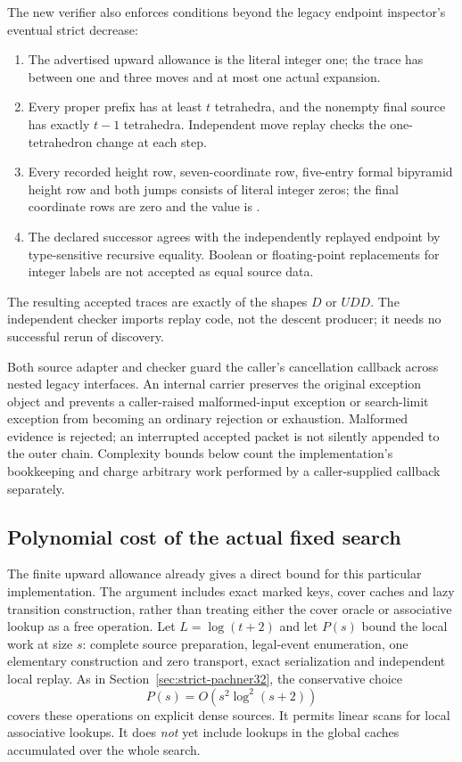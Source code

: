 The new verifier also enforces conditions beyond the legacy endpoint
inspector's eventual strict decrease:
\begin{enumerate}
\item The advertised upward allowance is the literal integer one; the
      trace has between one and three moves and at most one actual
      expansion.
\item Every proper prefix has at least $t$ tetrahedra, and the nonempty
      final source has exactly $t-1$ tetrahedra.  Independent move replay
      checks the one-tetrahedron change at each step.
\item Every recorded height row, seven-coordinate row, five-entry
      formal bipyramid height row and both jumps consists of literal
      integer zeros; the final coordinate rows are zero and the
       value is .
\item The declared successor agrees with the independently replayed
      endpoint by type-sensitive recursive equality.  Boolean or
      floating-point replacements for integer labels are not accepted
      as equal source data.
\end{enumerate}
The resulting accepted traces are exactly of the shapes $D$ or $UDD$.
The independent checker imports replay code, not the descent producer;
it needs no successful rerun of discovery.

Both source adapter and checker guard the caller's cancellation callback
across nested legacy interfaces.  An internal carrier preserves the
original exception object and prevents a caller-raised malformed-input
exception or search-limit exception from becoming an ordinary rejection
or exhaustion.  Malformed evidence is rejected; an interrupted accepted
packet is not silently appended to the outer chain.  Complexity bounds
below count the implementation's bookkeeping and charge arbitrary work
performed by a caller-supplied callback separately.

\subsection{Polynomial cost of the actual fixed search}

The finite upward allowance already gives a direct bound for this
particular implementation.  The argument includes exact marked keys,
cover caches and lazy transition construction, rather than treating
either the cover oracle or associative lookup as a free operation.
Let $L=\log(t+2)$ and let $P(s)$ bound the local work at size $s$:
complete source preparation, legal-event enumeration, one elementary
construction and zero transport, exact serialization and independent
local replay.  As in Section~\ref{sec:strict-pachner32}, the conservative
choice
\[
                           P(s)=O(s^2\log^2(s+2))
\]
covers these operations on explicit dense sources.  It permits linear
scans for local associative lookups.  It does \emph{not} yet include
lookups in the global caches accumulated over the whole search.

